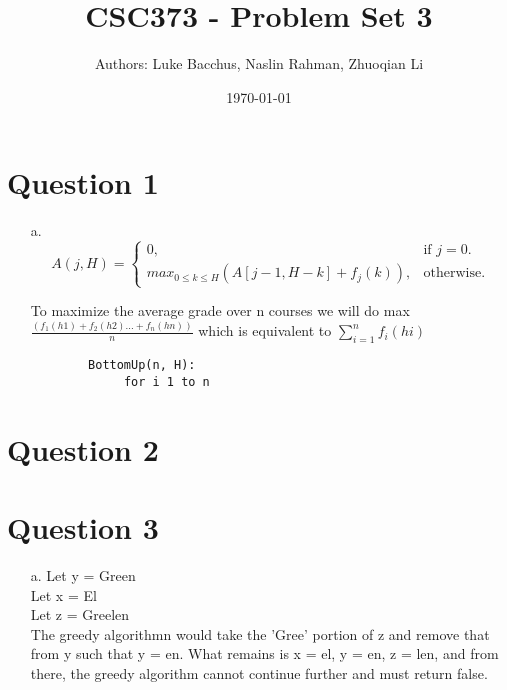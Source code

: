\documentclass[12pt]{article}
\title{\textbf{CSC373 - Problem Set 3}}
\author{Authors: Luke Bacchus, Naslin Rahman, Zhuoqian Li}
\date{\today}
\begin{document}
\maketitle
\section*{Question 1}
\begin{enumerate}
    \item[a.] \begin{equation}
            A(j,H)=\begin{cases}
         0, & \text{if $j=0$}.\\
        max_{0 \leq k \leq H}(A[j-1,H-k] + f_j(k)), & \text{otherwise}.
        \end{cases}
        \end{equation}
  
    To maximize the average grade over n courses we will do max $\frac{(f_1(h1) + f_2(h2) ... + f_n(hn))}{n}$ which is equivalent to $\sum_{i = 1}^ {n} f_i(hi)$
  
    \begin{verbatim}
        BottomUp(n, H):
             for i 1 to n
    \end{verbatim}
\end{enumerate}
    
\section*{Question 2}

\section*{Question 3} 
\begin{enumerate}
    \item[a.] Let y = Green\\
              Let x = El\\
              Let z = Greelen\\
 
              The greedy algorithmn would take the 'Gree' portion of z and remove that from y such that y = en.
              What remains is x = el, y = en, z = len, and from there, the greedy algorithm cannot continue further
              and must return false.


\end{enumerate}
\end{document}
